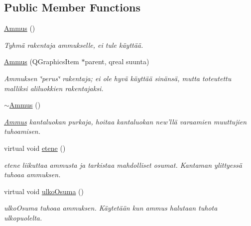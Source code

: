 \subsection*{Public Member Functions}
\begin{DoxyCompactItemize}
\item 
\hypertarget{class_ammus_a7d181d103a138ac9955a612def8a68ce}{\hyperlink{class_ammus_a7d181d103a138ac9955a612def8a68ce}{Ammus} ()}\label{class_ammus_a7d181d103a138ac9955a612def8a68ce}

\begin{DoxyCompactList}\small\item\em Tyhmä rakentaja ammukselle, ei tule käyttää. \end{DoxyCompactList}\item 
\hyperlink{class_ammus_aa177444791e94b517355b6f9bce564d2}{Ammus} (Q\-Graphics\-Item $\ast$parent, qreal suunta)
\begin{DoxyCompactList}\small\item\em Ammuksen \char`\"{}perus\char`\"{} rakentaja; ei ole hyvä käyttää sinänsä, mutta toteutettu malliksi aliluokkien rakentajaksi. \end{DoxyCompactList}\item 
\hypertarget{class_ammus_a0363c773453437b858da09e72383732a}{\hyperlink{class_ammus_a0363c773453437b858da09e72383732a}{$\sim$\-Ammus} ()}\label{class_ammus_a0363c773453437b858da09e72383732a}

\begin{DoxyCompactList}\small\item\em \hyperlink{class_ammus}{Ammus} kantaluokan purkaja, hoitaa kantaluokan new'llä varaamien muuttujien tuhoamisen. \end{DoxyCompactList}\item 
virtual void \hyperlink{class_ammus_a965bb7b91b351d4ed21de577f980968d}{etene} ()
\begin{DoxyCompactList}\small\item\em etene liikuttaa ammusta ja tarkistaa mahdolliset osumat. Kantaman ylittyessä tuhoaa ammuksen. \end{DoxyCompactList}\item 
virtual void \hyperlink{class_ammus_a8863947b7cd97ddc5f0ac587547e2305}{ulko\-Osuma} ()
\begin{DoxyCompactList}\small\item\em ulko\-Osuma tuhoaa ammuksen. Käytetään kun ammus halutaan tuhota ulkopuolelta. \end{DoxyCompactList}\end{DoxyCompactItemize}
